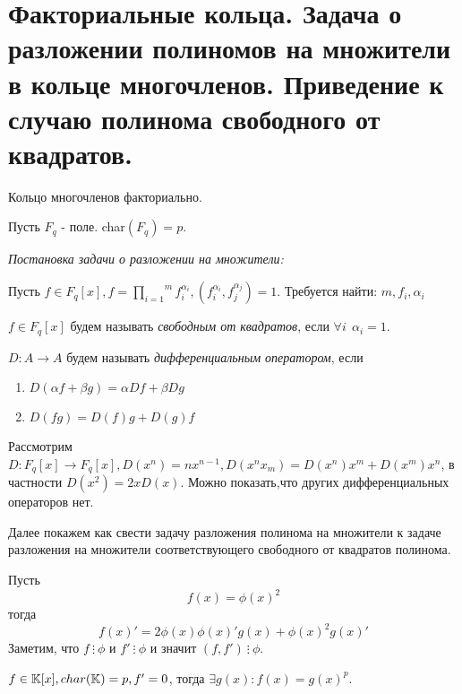 \section{Факториальные кольца. Задача о разложении полиномов на множители в кольце многочленов. Приведение к случаю полинома свободного от квадратов.}

\begin{thm}
  Кольцо многочленов факториально. \newline
\end{thm}

Пусть $ F_{q} $ - поле. char$(F_q) = p $. \newline

\emph{Постановка задачи о разложении на множители:} \newline

Пусть $ f \in F_{q}[x],  f = \overset{m}{\underset{i = 1}{\prod}} f_i^{\alpha_i},
 (f_i^{\alpha_i}, f_j^{\alpha_j}) = 1 $. Требуется найти: $ m, f_i, \alpha_i $

\begin{defn}
  $ f \in F_{q}[x] $ будем называть \emph{свободным от квадратов}, если $ \forall i ~~ \alpha_i = 1 $.
\end{defn}

\begin{defn}
  $ D : A \rightarrow A $ будем называть \emph{дифференциальным оператором}, если 
  \begin{enumerate}
    \item $ D({\alpha}f + {\beta}g) = {\alpha}Df + {\beta}Dg $
    \item $ D(fg) = D(f)g + D(g)f $
  \end{enumerate}
\end{defn}

Рассмотрим $ D : F_q[x] \rightarrow F_q[x], D(x^n) = nx^{n-1}, D(x^{n}x_{m}) = D(x^n)x^m + D(x^m)x^n $, 
в частности $ D(x^2) = 2xD(x) $. Можно показать,что других дифференциальных операторов нет.

Далее покажем как свести задачу разложения полинома на множители к задаче разложения на множители соответствующего
свободного от квадратов полинома.

Пусть \[ f(x) = \phi(x)^2 \] тогда \[ f(x)' = 2\phi(x)\phi(x)'g(x) + \phi(x)^2g(x)' \]
Заметим, что $ f ~ \vdots ~ \phi $ и $ f' ~ \vdots ~ \phi $ и значит $ (f, f') ~ \vdots ~ \phi $.

\begin{lem}
  $ f \in \mathbb{K}[x], char(\mathbb{K}) = p, f' = 0 $, тогда $ \exists g(x) : f(x) = g(x)^p $. 
\end{lem}

